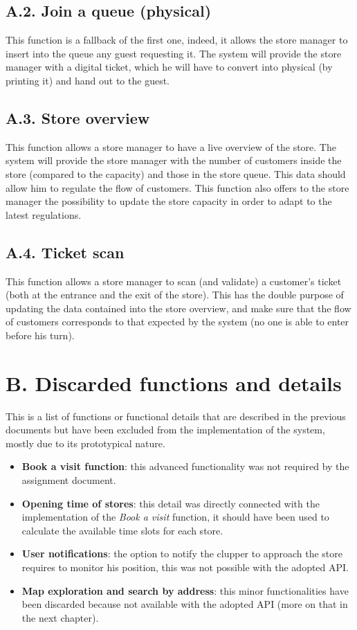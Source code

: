 \subsection{A.2. Join a queue (physical)}

This function is a fallback of the first one, indeed, it allows the store manager to insert into the queue any guest requesting it.
The system will provide the store manager with a digital ticket, which he will have to convert into physical (by printing it) and hand out to the guest.

\subsection{A.3. Store overview}

This function allows a store manager to have a live overview of the store.
The system will provide the store manager with the number of customers inside the store (compared to the capacity) and those in the store queue.
This data should allow him to regulate the flow of customers.
This function also offers to the store manager the possibility to update the store capacity in order to adapt to the latest regulations.

\subsection{A.4. Ticket scan}

This function allows a store manager to scan (and validate) a customer’s ticket (both at the entrance and the exit of the store).
This has the double purpose of updating the data contained into the store overview, and make sure that the flow of customers corresponds to that expected by the system (no one is able to enter before his turn).

\section{B. Discarded functions and details}

This is a list of functions or functional details that are described in the previous documents but have been excluded from the implementation of the system, mostly due to its prototypical nature.
\begin{itemize}
  \item \textbf{Book a visit function}: this advanced functionality was not required by the assignment document.
  \item \textbf{Opening time of stores}: this detail was directly connected with the implementation of the \emph{Book a visit} function, it should have been used to calculate the available time slots for each store.
  \item \textbf{User notifications}: the option to notify the clupper to approach the store requires to monitor his position, this was not possible with the adopted API.
  \item \textbf{Map exploration and search by address}: this minor functionalities have been discarded because not available with the adopted API (more on that in the next chapter).
\end{itemize}

